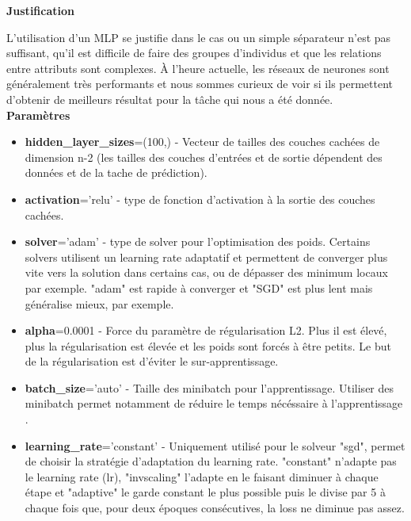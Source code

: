 \documentclass{ceri/sty/rapport}
\begin{document}
\textbf{Justification}

L'utilisation d'un MLP se justifie dans le cas ou un simple séparateur n'est pas suffisant, qu'il est difficile de faire des groupes d'individus et que les relations entre attributs sont complexes. À l'heure actuelle, les réseaux de neurones sont généralement très performants et nous sommes curieux de voir si ils permettent d'obtenir de meilleurs résultat pour la tâche qui nous a été donnée.\\

\textbf{Paramètres}

\begin{itemize}
    \item \textbf{hidden\_layer\_sizes}=(100,) - Vecteur de tailles des couches cachées de dimension n-2 (les tailles des couches d'entrées et de sortie dépendent des données et de la tache de prédiction).\\
   	
    \item \textbf{activation}='relu' - type de fonction d'activation à la sortie des couches cachées.\\
   	
    \item \textbf{solver}='adam' - type de solver pour l'optimisation des poids. Certains solvers utilisent un learning rate adaptatif et permettent de converger plus vite vers la solution dans certains cas, ou de dépasser des minimum locaux par exemple. "adam" est rapide à converger et "SGD" est plus lent mais généralise mieux, par exemple.\\
    
    \item \textbf{alpha}=0.0001 - Force du paramètre de régularisation L2. Plus il est élevé, plus la régularisation est élevée et les poids sont forcés à être petits. Le but de la régularisation est d'éviter le sur-apprentissage.\\
    
    \item \textbf{batch\_size}='auto' - Taille des minibatch pour l'apprentissage. Utiliser des minibatch permet notamment de réduire le temps nécéssaire à l'apprentissage .\\
    
    \item \textbf{learning\_rate}='constant' - Uniquement utilisé pour le solveur "sgd", permet de choisir la stratégie d'adaptation du learning rate. "constant" n'adapte pas le learning rate (lr), "invscaling" l'adapte en le faisant diminuer à chaque étape et "adaptive" le garde constant le plus possible puis le divise par 5 à chaque fois que, pour deux époques consécutives, la loss ne diminue pas assez.\\
    

\end{itemize}
\end{document}
